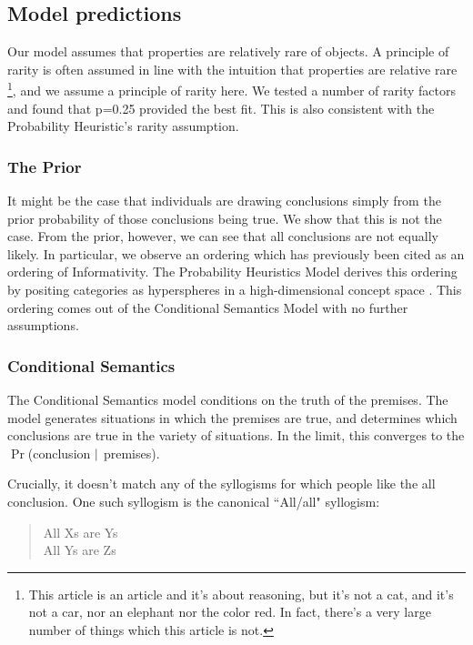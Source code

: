 \documentclass[10pt,letterpaper]{article}
\begin{document}
\subsection{Model predictions}

Our model assumes that properties are relatively rare of objects.  A principle of rarity is often assumed in line with the intuition that properties are relative rare \footnote{This article is an article and it's about reasoning, but it's not a cat, and it's not a car, nor an elephant nor the color red. In fact, there's a very large number of things which this article is not.}, and we assume a principle of rarity here. We tested a number of rarity factors and found that p=0.25 provided the best fit. This is also consistent with the Probability Heuristic's rarity assumption. 


\subsubsection{The Prior}
It might be the case that individuals are drawing conclusions simply from the prior probability of those conclusions being true. We show that this is not the case. From the prior, however, we can see that all conclusions are not equally likely. In particular, we observe an ordering which has previously been cited as an ordering of Informativity. The Probability Heuristics Model derives this ordering by positing categories as hyperspheres in a high-dimensional concept space \cite{Chater1999}. This ordering comes out of the Conditional Semantics Model with no further assumptions.

\subsubsection{Conditional Semantics}

The Conditional Semantics model conditions on the truth of the premises. The model generates situations in which the premises are true, and determines which conclusions are true in the variety of situations. In the limit, this converges to the $\Pr$(conclusion $\arrowvert$ premises). 

 Crucially, it doesn't match any of the syllogisms for which people like the all conclusion. One such syllogism is the canonical ``All/all" syllogism:

\begin{quote}
All Xs are Ys \\
All Ys are Zs \\
\end{quote}
\end{document}

